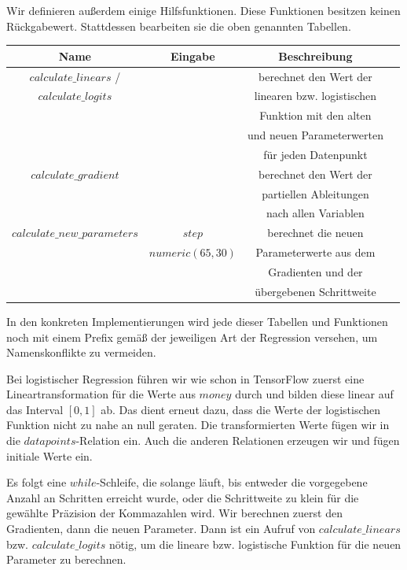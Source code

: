 Wir definieren außerdem einige Hilfsfunktionen. Diese Funktionen besitzen keinen Rückgabewert. Stattdessen bearbeiten sie die oben genannten Tabellen.
\begin{center}
  \begin{tabular}{|c|c|c|c|}\hline
    \textbf{Name} & \textbf{Eingabe} & \textbf{Beschreibung} \\ \hline
    $calculate\_linears$ / & & berechnet den Wert der \\
    $calculate\_logits$ & & linearen bzw. logistischen \\
    & & Funktion mit den alten \\
    & & und neuen Parameterwerten \\
    & & für jeden Datenpunkt \\ \hline
    $calculate\_gradient$ & & berechnet den Wert der \\
    & & partiellen Ableitungen \\
    & & nach allen Variablen \\ \hline
    $calculate\_new\_parameters$ & $step$ & berechnet die neuen \\
    & $numeric(65, 30)$ & Parameterwerte aus dem \\
    & & Gradienten und der \\
    & & übergebenen Schrittweite \\ \hline
  \end{tabular}
\end{center}

In den konkreten Implementierungen wird jede dieser Tabellen und Funktionen noch mit einem Prefix gemäß der jeweiligen Art der Regression versehen, um Namenskonflikte zu vermeiden.

Bei logistischer Regression führen wir wie schon in TensorFlow zuerst eine Lineartransformation für die Werte aus $money$ durch und bilden diese linear auf das Interval $[0, 1]$ ab. Das dient erneut dazu, dass die Werte der logistischen Funktion nicht zu nahe an null geraten. Die transformierten Werte fügen wir in die $datapoints$-Relation ein. Auch die anderen Relationen erzeugen wir und fügen initiale Werte ein.

Es folgt eine $while$-Schleife, die solange läuft, bis entweder die vorgegebene Anzahl an Schritten erreicht wurde, oder die Schrittweite zu klein für die gewählte Präzision der Kommazahlen wird. Wir berechnen zuerst den Gradienten, dann die neuen Parameter. Dann ist ein Aufruf von $calculate\_linears$ bzw. $calculate\_logits$ nötig, um die lineare bzw. logistische Funktion für die neuen Parameter zu berechnen.

